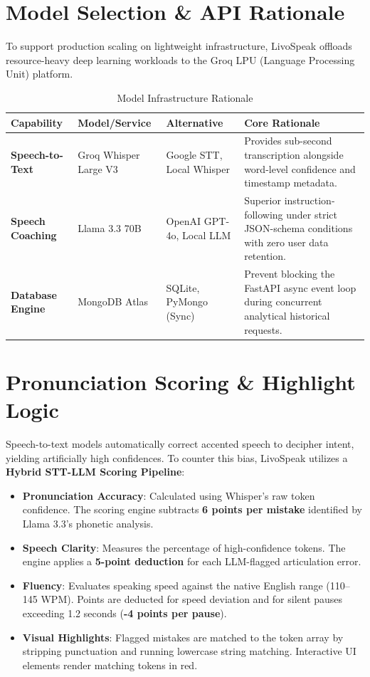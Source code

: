 \documentclass[11pt,a4paper]{article}
\begin{document}
\section{Model Selection \& API Rationale}
To support production scaling on lightweight infrastructure, LivoSpeak offloads resource-heavy deep learning workloads to the Groq LPU (Language Processing Unit) platform.

\begin{table}[h]
\centering
\caption{Model Infrastructure Rationale}
\begin{tabular}{lllp{6cm}}
\toprule
\textbf{Capability} & \textbf{Model/Service} & \textbf{Alternative} & \textbf{Core Rationale} \\
\midrule
\textbf{Speech-to-Text} & Groq Whisper Large V3 & Google STT, Local Whisper & Provides sub-second transcription alongside word-level confidence and timestamp metadata. \\
\textbf{Speech Coaching} & Llama 3.3 70B & OpenAI GPT-4o, Local LLM & Superior instruction-following under strict JSON-schema conditions with zero user data retention. \\
\textbf{Database Engine} & MongoDB Atlas & SQLite, PyMongo (Sync) & Prevent blocking the FastAPI async event loop during concurrent analytical historical requests. \\
\bottomrule
\end{tabular}
\end{table}

\newpage

\section{Pronunciation Scoring \& Highlight Logic}
Speech-to-text models automatically correct accented speech to decipher intent, yielding artificially high confidences. To counter this bias, LivoSpeak utilizes a \textbf{Hybrid STT-LLM Scoring Pipeline}:

\begin{itemize}
    \item \textbf{Pronunciation Accuracy}: Calculated using Whisper's raw token confidence. The scoring engine subtracts \textbf{6 points per mistake} identified by Llama 3.3's phonetic analysis.
    \item \textbf{Speech Clarity}: Measures the percentage of high-confidence tokens. The engine applies a \textbf{5-point deduction} for each LLM-flagged articulation error.
    \item \textbf{Fluency}: Evaluates speaking speed against the native English range (110--145 WPM). Points are deducted for speed deviation and for silent pauses exceeding 1.2 seconds (\textbf{-4 points per pause}).
    \item \textbf{Visual Highlights}: Flagged mistakes are matched to the token array by stripping punctuation and running lowercase string matching. Interactive UI elements render matching tokens in red.
\end{itemize}
\end{document}
